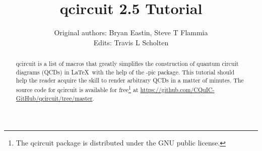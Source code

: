 \documentclass[twocolumn,nofootinbib]{revtex4}
\begin{document}
\lstset{language=TeX}

\title{qcircuit 2.5 Tutorial}

\author{Original authors: Bryan Eastin, Steve T Flammia\\ Edits: Travis L Scholten}
	
\begin{abstract}qcircuit is a list of macros that greatly simplifies the construction of 
quantum circuit diagrams (QCDs) in \LaTeX \ with the help of the \Xy-pic 
package.  This tutorial should help the reader acquire 
the skill to render arbitrary QCDs in a matter of minutes. The source code for qcircuit is available for free\footnote{The qcircuit package is distributed under the GNU public license.} at \href{https://github.com/CQuIC-GitHub/qcircuit/tree/master}{https://github.com/CQuIC-GitHub/qcircuit/tree/master}.
\end{abstract}

\maketitle
\end{document}
